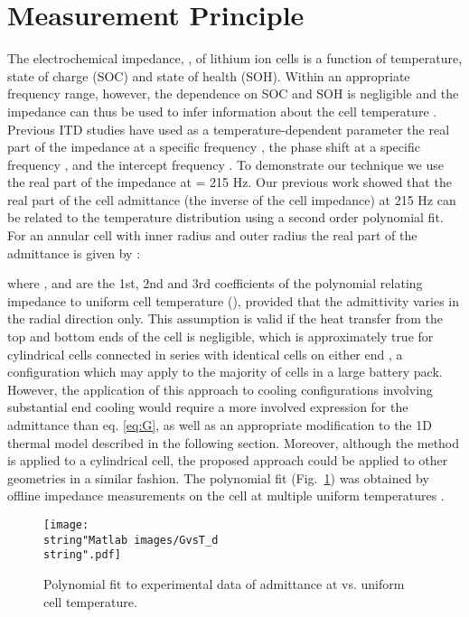 \documentclass[journal, english]{IEEEtran}
\begin{document}
\section{Measurement Principle}
The electrochemical impedance, , of lithium ion cells is a function of temperature, state of charge
(SOC) and state of health (SOH). Within an appropriate frequency
range, however, the dependence on SOC and SOH is negligible
and the impedance can thus be used to infer information about the
cell temperature \cite{Srinivasan2011c}. Previous ITD studies have
used as a temperature-dependent parameter the real part of the impedance
at a specific frequency \cite{Schmidt2013a}, the phase shift at a
specific frequency \cite{Srinivasan2011c,Srinivasan2012a}, and the
intercept frequency \cite{Raijmakers2014d}. To demonstrate our technique
we use the real part of the impedance at  = 215 Hz. Our previous
work showed that the real part of the cell admittance (the inverse
of the cell impedance) at 215 Hz can be related to the temperature
distribution using a second order polynomial fit. For an annular cell
with inner radius  and outer radius  the real part  of the admittance
is given by \cite{Richardson2014}:

where ,  and  are the 1st, 2nd and 3rd coefficients
of the polynomial relating impedance to uniform cell temperature (),
provided that the admittivity varies in the radial direction only.
This assumption is valid if the heat transfer from the top and bottom
ends of the cell is negligible, which is approximately true for cylindrical
cells connected in series with identical cells on either end \cite{Fleckenstein2011},
a configuration which may apply to the majority of cells in a large
battery pack.
However, the application of this approach to cooling configurations involving substantial end cooling would require a more involved expression for the admittance than  eq. \ref{eq:G}, as well as an appropriate modification to the 1D thermal model described in the following section.
Moreover, although the method is applied to a cylindrical cell, the proposed approach could be applied to other geometries in a similar fashion.
The polynomial fit (Fig.\ \ref{fig:Polynomial-fit})
was obtained by offline impedance measurements on the cell at multiple
uniform temperatures \cite{Richardson2014}.
\begin{figure}[h]
\begin{centering}
\texttt{[image: \\string"Matlab images/GvsT\_d\\string".pdf]}
\par\end{centering}
\caption{Polynomial fit to experimental data of admittance at 
vs. uniform cell temperature.\label{fig:Polynomial-fit}}
\end{figure}
\end{document}
